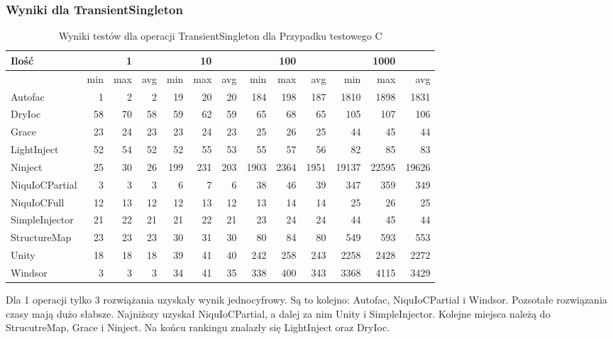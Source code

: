 \documentclass[12pt]{article}
\begin{document}
\subsubsection{Wyniki dla TransientSingleton}
\begin{table}[H]
\captionsetup{belowskip=0pt,aboveskip=0pt}
\begin{center}
\begin{small}
	\begin{tabular}{ | l | r r r | r r r | r r r | r r r | }
    		\hline
Ilość & & 1 & & & 10 & & & 100 & & & 1000 & \\ \hline
 & min & max & avg & min & max & avg & min & max & avg & min & max & avg \\ \hline
Autofac & 1 & 2 & 2 & 19 & 20 & 20 & 184 & 198 & 187 & 1810 & 1898 & 1831 \\ \hline
DryIoc & 58 & 70 & 58 & 59 & 62 & 59 & 65 & 68 & 65 & 105 & 107 & 106 \\ \hline
Grace & 23 & 24 & 23 & 23 & 24 & 23 & 25 & 26 & 25 & 44 & 45 & 44 \\ \hline
LightInject & 52 & 54 & 52 & 52 & 55 & 53 & 55 & 57 & 56 & 82 & 85 & 83 \\ \hline
Ninject & 25 & 30 & 26 & 199 & 231 & 203 & 1903 & 2364 & 1951 & 19137 & 22595 & 19626 \\ \hline
NiquIoCPartial & 3 & 3 & 3 & 6 & 7 & 6 & 38 & 46 & 39 & 347 & 359 & 349 \\ \hline
NiquIoCFull & 12 & 13 & 12 & 12 & 13 & 12 & 13 & 14 & 14 & 25 & 26 & 25 \\ \hline
SimpleInjector & 21 & 22 & 21 & 21 & 22 & 21 & 23 & 24 & 24 & 44 & 45 & 44 \\ \hline
StructureMap & 23 & 23 & 23 & 30 & 31 & 30 & 80 & 84 & 80 & 549 & 593 & 553 \\ \hline
Unity & 18 & 18 & 18 & 39 & 41 & 40 & 242 & 258 & 243 & 2258 & 2428 & 2272 \\ \hline
Windsor & 3 & 3 & 3 & 34 & 41 & 35 & 338 & 400 & 343 & 3368 & 4115 & 3429 \\ \hline
  	\end{tabular}
\end{small}
\end{center}
\caption{Wyniki testów dla operacji TransientSingleton dla Przypadku testowego C}
\label{TestCaseC_TransientSingleton}
\end{table}
Dla 1 operacji tylko 3 rozwiążania uzyskały wynik jednocyfrowy. Są to kolejno: Autofac, NiquIoCPartial i Windsor. Pozsotałe rozwiązania czasy mają dużo słabsze. Najniższy uzyskał NiquIoCPartial, a dalej za nim Unity i SimpleInjector. Kolejne miejsca należą do StrucutreMap, Grace i Ninject. Na końcu rankingu znalazły się LightInject oraz DryIoc.\\
\end{document}
